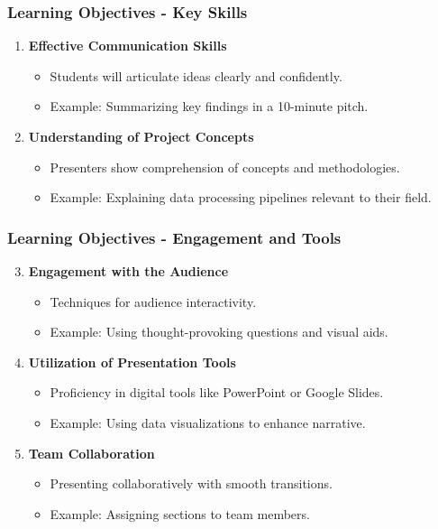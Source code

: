 \documentclass{beamer}
\begin{document}
\begin{frame}[fragile]
    \frametitle{Learning Objectives - Key Skills}
    \begin{enumerate}
        \item \textbf{Effective Communication Skills}
        \begin{itemize}
            \item Students will articulate ideas clearly and confidently.
            \item Example: Summarizing key findings in a 10-minute pitch.
        \end{itemize}

        \item \textbf{Understanding of Project Concepts}
        \begin{itemize}
            \item Presenters show comprehension of concepts and methodologies.
            \item Example: Explaining data processing pipelines relevant to their field.
        \end{itemize}
    \end{enumerate}
\end{frame}

\begin{frame}[fragile]
    \frametitle{Learning Objectives - Engagement and Tools}
    \begin{enumerate}
        \setcounter{enumi}{2}
        \item \textbf{Engagement with the Audience}
        \begin{itemize}
            \item Techniques for audience interactivity.
            \item Example: Using thought-provoking questions and visual aids.
        \end{itemize}

        \item \textbf{Utilization of Presentation Tools}
        \begin{itemize}
            \item Proficiency in digital tools like PowerPoint or Google Slides.
            \item Example: Using data visualizations to enhance narrative.
        \end{itemize}

        \item \textbf{Team Collaboration}
        \begin{itemize}
            \item Presenting collaboratively with smooth transitions.
            \item Example: Assigning sections to team members.
        \end{itemize}
    \end{enumerate}
\end{frame}
\end{document}
